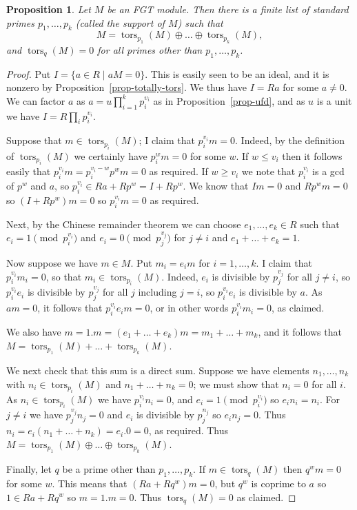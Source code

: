\documentclass{amsart}
\newcommand{\tors}      {\operatorname{tors}}
\newcommand{\st}        {\;|\;}
\newcommand{\op}        {\oplus}
\renewcommand{\:}{\colon}
\newtheorem{proposition}[theorem]{Proposition}
\theoremstyle{definition}
\begin{document}
\begin{proposition}
 Let $M$ be an FGT module.  Then there is a finite list of standard
 primes $p_1,\ldots,p_k$ (called the \emph{support} of $M$) such that
 \[ M = \tors_{p_1}(M) \op\ldots\op \tors_{p_k}(M), \]
 and $\tors_q(M)=0$ for all primes other than $p_1,\ldots,p_k$.
\end{proposition}
\begin{proof}
 Put $I=\{a\in R\st aM=0\}$.  This is easily seen to be an ideal, and
 it is nonzero by Proposition~\ref{prop-totally-tors}.  We thus have
 $I=Ra$ for some $a\neq 0$.  We can factor $a$ as
 $a=u\prod_{i=1}^kp_i^{v_i}$ as in Proposition~\ref{prop-ufd}, and as
 $u$ is a unit we have $I=R\prod_ip_i^{v_i}$.  

 Suppose that $m\in\tors_{p_i}(M)$; I claim that $p_i^{v_i}m=0$.
 Indeed, by the definition of $\tors_{p_i}(M)$ we certainly have
 $p_i^wm=0$ for some $w$.  If $w\leq v_i$ then it follows easily that
 $p_i^{v_i}m=p_i^{v_i-w}p^wm=0$ as required.  If $w\geq v_i$ we note
 that $p_i^{v_i}$ is a gcd of $p^w$ and $a$, so
 $p_i^{v_i}\in Ra+Rp^w=I+Rp^w$.  We know that $Im=0$ and $Rp^wm=0$ so
 $(I+Rp^w)m=0$ so $p_i^{v_i}m=0$ as required.  

 Next, by the Chinese remainder theorem we can choose
 $e_1,\ldots,e_k\in R$ such that $e_i=1\pmod{p_i^{v_i}}$ and
 $e_i=0\pmod{p_j^{v_j}}$ for $j\neq i$ and $e_1+\ldots+e_k=1$.

 Now suppose we have $m\in M$.  Put $m_i=e_im$ for $i=1,\ldots,k$.  I
 claim that $p_i^{v_i}m_i=0$, so that $m_i\in\tors_{p_i}(M)$.  Indeed,
 $e_i$ is divisible by $p_j^{v_j}$ for all $j\neq i$, so
 $p_i^{v_i}e_i$ is divisible by $p_j^{v_j}$ for all $j$ including
 $j=i$, so $p_i^{v_i}e_i$ is divisible by $a$.  As $am=0$, it follows
 that $p_i^{v_i}e_im=0$, or in other words $p_i^{v_i}m_i=0$, as
 claimed. 

 We also have $m=1.m=(e_1+\ldots+e_k)m=m_1+\ldots+m_k$, and it follows
 that $M=\tors_{p_1}(M)+\ldots+\tors_{p_k}(M)$.

 We next check that this sum is a direct sum.  Suppose we have
 elements $n_1,\ldots,n_k$ with $n_i\in\tors_{p_i}(M)$ and
 $n_1+\ldots+n_k=0$; we must show that $n_i=0$ for all $i$.  As
 $n_i\in\tors_{p_i}(M)$ we have $p_i^{v_i}n_i=0$, and
 $e_i=1\pmod{p_i^{v_i}}$ so $e_in_i=n_i$.  For $j\neq i$ we have
 $p_j^{v_j}n_j=0$ and $e_i$ is divisible by $p_j^{n_j}$ so
 $e_in_j=0$.  Thus $n_i=e_i(n_1+\ldots+n_k)=e_i.0=0$, as required.
 Thus $M=\tors_{p_1}(M) \op\ldots\op \tors_{p_k}(M)$.  

 Finally, let $q$ be a prime other than $p_1,\ldots,p_k$.  If
 $m\in\tors_q(M)$ then $q^wm=0$ for some $w$.  This means that
 $(Ra+Rq^w)m=0$, but $q^w$ is coprime to $a$ so $1\in Ra+Rq^w$ so
 $m=1.m=0$.  Thus $\tors_q(M)=0$ as claimed.
\end{proof}


% 
\end{document}
